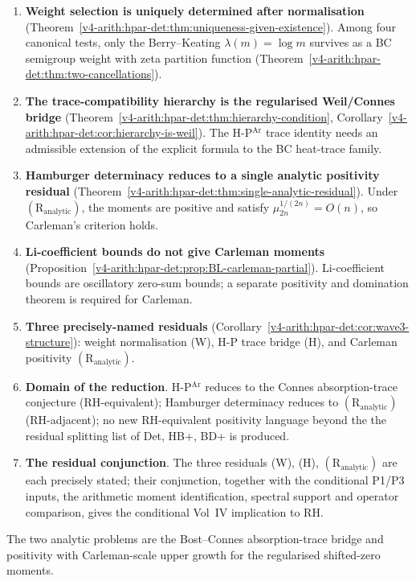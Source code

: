 \begin{enumerate}
\item \textbf{Weight selection is uniquely determined after
normalisation}
(Theorem~\ref{v4-arith:hpar-det:thm:uniqueness-given-existence}). Among four
canonical tests, only the Berry--Keating \(\lambda(m)=\log m\)
survives as a BC semigroup weight with zeta partition function
(Theorem~\ref{v4-arith:hpar-det:thm:two-cancellations}).
\item \textbf{The trace-compatibility hierarchy is the regularised
Weil/Connes bridge}
(Theorem~\ref{v4-arith:hpar-det:thm:hierarchy-condition},
Corollary~\ref{v4-arith:hpar-det:cor:hierarchy-is-weil}). The
H-P\(^{\mathrm{Ar}}\) trace identity needs an admissible extension of
the explicit formula to the BC heat-trace family.
\item \textbf{Hamburger determinacy reduces to a single analytic
positivity residual}
(Theorem~\ref{v4-arith:hpar-det:thm:single-analytic-residual}). Under
\((\mathrm{R}_{\mathrm{analytic}})\), the moments are positive and
satisfy \(\mu_{2n}^{1/(2n)}=O(n)\), so Carleman's criterion holds.
\item \textbf{Li-coefficient bounds do not give Carleman moments}
(Proposition~\ref{v4-arith:hpar-det:prop:BL-carleman-partial}).
Li-coefficient bounds are oscillatory zero-sum bounds; a separate
positivity and domination theorem is required for Carleman.
\item \textbf{Three precisely-named residuals}
(Corollary~\ref{v4-arith:hpar-det:cor:wave3-structure}): weight
normalisation (W), H-P trace bridge (H), and Carleman positivity
\((\mathrm{R}_{\mathrm{analytic}})\).
\item \textbf{Domain of the reduction}. H-P\(^{\mathrm{Ar}}\) reduces to
the Connes absorption-trace conjecture (RH-equivalent); Hamburger
determinacy reduces to \((\mathrm{R}_{\mathrm{analytic}})\)
(RH-adjacent); no new RH-equivalent positivity language beyond the
the residual splitting list of Det, HB+, BD+ is produced.
\item \textbf{The residual conjunction}. The three residuals
(W), (H), \((\mathrm{R}_{\mathrm{analytic}})\) are each precisely
stated; their conjunction, together with the conditional P1/P3 inputs,
the arithmetic moment identification, spectral support and operator
comparison, gives the conditional Vol~IV implication to RH.
\end{enumerate}

The two analytic problems are the Bost--Connes absorption-trace
bridge and positivity with Carleman-scale upper growth for the
regularised shifted-zero moments.
